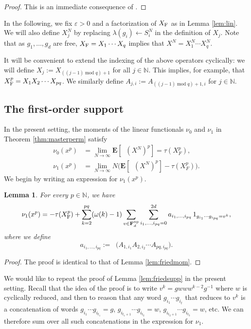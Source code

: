 \documentclass[10pt,reqno]{amsart}
\newtheorem{lem}[thm]{Lemma}
\theoremstyle{definition}
\theoremstyle{remark}
\numberwithin{equation}{section}
\numberwithin{figure}{section}
\numberwithin{table}{section}
\newcommand{\ntrD}{\mathop{\mathrm{tr}_D}}
\newcommand{\ntrND}{\mathop{\mathrm{tr}_{DN}}}
\newcommand{\EE}{\mathbf{E}}
\begin{document}
\begin{proof}
This is an immediate consequence of \cite[Theorem 1]{Pis18}.
\end{proof}

In the following, we fix $\varepsilon>0$ and a factorization of $X_{\rm 
F}$ as in Lemma \ref{lem:lin}. We will also define $X_j^N$ by replacing
$\lambda(g_i)\leftarrow S_i^N$ in the definition of $X_j$. Note that as 
$g_1,\ldots,g_d$ are free, $X_{\rm F}=X_1\cdots X_q$ implies that
$X^N=X^N_1\cdots X^N_q$.

It will be convenient to extend the indexing of the above operators 
cyclically: we will define $X_j := X_{((j-1)\mathop{\mathrm{mod}}q)+1}$ 
for all $j\in\mathbb{N}$. This implies, for example, that $X_{\rm F}^p = 
X_1X_2\cdots X_{pq}$. We similarly define $A_{j,i} := 
A_{((j-1)\mathop{\mathrm{mod}}q)+1,i}$ for $j\in\mathbb{N}$.


\subsection{The first-order support}

In the present setting, the moments of the linear functionals $\nu_0$ and 
$\nu_1$ in Theorem \ref{thm:masterperm} satisfy
\begin{align*}
	\nu_0(x^p) &= \lim_{N\to\infty} \EE[\ntrND (X^N)^p]
	= \tau(X_F^p), \\
	\nu_1(x^p) &= \lim_{N\to\infty} N\big(
	\EE[\ntrND (X^N)^p] - \tau(X_F^p)\big).
\end{align*}
We begin by writing an expression for $\nu_1(x^p)$.

\begin{lem}
\label{lem:safmom}
For every $p\in\mathbb{N}$, we have
$$
        \nu_1(x^p) = - \tau(X_{\rm F}^p) +
        \sum_{k=2}^{pq} (\omega(k)-1)
	\sum_{v\in\mathbf{F}_d^{\rm np}}
        \sum_{i_1,\ldots,i_{pq}=0}^{2d}
	a_{i_1,\ldots,i_{pq}}\,
        1_{g_{i_1}\cdots g_{i_{pq}}=v^k},
$$
where we define
$$
	a_{i_1,\ldots,i_{pq}} := 
	\ntrD\big(A_{1,i_1}A_{2,i_2}\cdots A_{pq,i_{pq}}\big).
$$
\end{lem}

\begin{proof}
The proof is identical to that of Lemma \ref{lem:friedmom}.
\end{proof}

We would like to repeat the proof of Lemma \ref{lem:friedsupp} in the 
present setting. Recall that the idea of the proof is to write 
$v^k=gwww^{k-2}g^{-1}$ where $w$ is cyclically reduced, and then to reason 
that any word $g_{i_1}\cdots g_{i_t}$ that reduces to $v^k$ is a 
concatenation of words $g_{i_1}\cdots g_{i_{t_1}}=g$, $g_{i_{t_1+1}}\cdots 
g_{i_{t_2}}=w$, $g_{i_{t_2+1}}\cdots g_{i_{t_3}}=w$, etc. We can therefore 
sum over all such concatenations in the expression for $\nu_1$.
\end{document}
